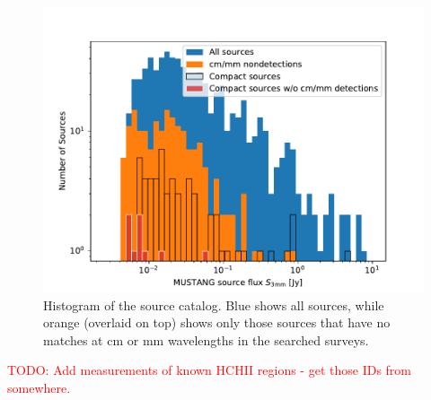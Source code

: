 \documentclass[twocolumn]{aastex62}
\def\todo#1{{\textcolor{red}{TODO: #1}}}
\begin{document}
\begin{figure}[htp]
    \includegraphics[width=17cm]{figures/full_catalog_histogram.pdf}
    \caption{Histogram of the source catalog.  Blue shows all sources,
    while orange (overlaid on top) shows only those sources that have
    no matches at cm or mm wavelengths in the searched surveys.}
\label{fig:fullcathist}
\end{figure}


\todo{Add measurements of known HCHII regions - get those IDs from somewhere.}

% 
% 
\end{document}
